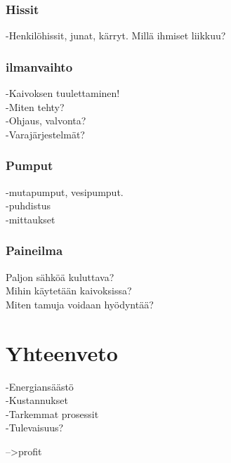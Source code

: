 \documentclass[finnish,12pt,a4paper,pdftex,elec,utf8]{aaltothesis}
\begin{document}
\subsubsection{Hissit}
-Henkilöhissit, junat, kärryt. Millä ihmiset liikkuu?

\subsubsection{ilmanvaihto}
-Kaivoksen tuulettaminen!\\
-Miten tehty?\\
-Ohjaus, valvonta?\\
-Varajärjestelmät?

\subsubsection{Pumput}
-mutapumput, vesipumput.\\
-puhdistus\\
-mittaukset

\subsubsection{Paineilma}
Paljon sähköä kuluttava?\\
Mihin käytetään kaivoksissa?\\
Miten tamuja voidaan hyödyntää?

\clearpage

\section{Yhteenveto}
-Energiansäästö\\
-Kustannukset\\
-Tarkemmat prosessit\\
-Tulevaisuus?

-->profit


\clearpage
\end{document}

